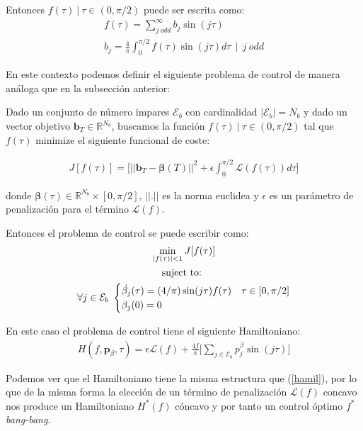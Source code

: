 Entonces  $f(\tau) \ | \ \tau \in (0,\pi/2)$ puede ser escrita como:
\begin{gather}
    f(\tau ) = \sum_{j \ odd}^\infty  b_j \sin(j \tau) \\
    b_j = \frac{4}{\pi}\int_0^{\pi/2} f(\tau ) \sin(j\tau)d\tau \ \ | \ \ j \ odd \label{bn_odd}
\end{gather}

En este contexto podemos definir el siguiente problema de control de manera análoga que en la subsección anterior:
\begin{problem}\label{OCP_bn}
    Dado un conjunto de número impares $\mathcal{E}_b$ con cardinalidad $|\mathcal{E}_b| = N_b$ y dado un vector objetivo $\bm{b}_T  \in \mathbb{R}^{N_b}$, buscamos la función $f(\tau ) \ | \ \tau \in (0,\pi/2)$ tal que  $f(\tau)$ minimize el siguiente funcional de coste:

        \begin{gather}
        J[f(\tau)] = \Bigg[ || \bm{b}_T - \bm{\beta}(T)||^2 + \epsilon \int_0^{\pi/2} \mathcal{L}(f(\tau)) d\tau \Bigg] 
    \end{gather}

    donde $ \bm{\beta}(\tau) \in \mathbb{R}^{N_b} \times [0,\pi/2] $,  $||.||$ es la norma euclidea y $\epsilon$ es un parámetro de penalización para el término $\mathcal{L}(f)$.
    \newline

    Entonces el problema de control se puede escribir como:
    \begin{gather}
        \min_{|f(\tau) |<1} J[f(\tau)] \\
        \notag \text{suject to: } \\
        \notag \forall j \in \mathcal{E}_b \
        \begin{cases}
            \dot{\beta_j}(\tau) = (4/\pi) \sin(j\tau) f(\tau) & \tau \in [0,\pi/2]\label{dyn}\\
            \beta_j(0) = 0
        \end{cases} 
    \end{gather}
\end{problem}

En este caso el problema de control tiene el siguiente Hamiltoniano:
\begin{gather}
    H(f,\bm{p}_\beta,\tau) = \epsilon  \mathcal{L}(f)+ 
    \frac{4f}{\pi} \Bigg[ 
        \sum_{j \in \mathcal{E}_b} p^\beta_j \sin(j\tau) 
    \Bigg]
\end{gather}

Podemos ver que el Hamiltoniano tiene la misma estructura que (\ref{hamil}), por lo que de la misma forma la elección de un término de penalización $\mathcal{L}(f)$ concavo nos produce un Hamiltoniano $H^*(f)$ cóncavo y por tanto un control óptimo $f^*$ \emph{bang-bang}.
